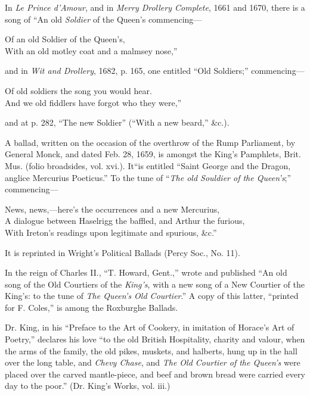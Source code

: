 In \textit{Le Prince d’Amour}, and in \textit{Merry Drollery Complete}, 1661 and 1670, there
is a song of “An old \textit{Soldier} of the Queen’s commencing—
\settowidth{\versewidth}{With an old motley coat and a malmsey nose,”}
\begin{scverse}
Of an old Soldier of the Queen’s,\\
With an old motley coat and a malmsey nose,”
\end{scverse}
and in \textit{Wit and Drollery}, 1682, p. 165, one entitled “Old Soldiers;” commencing—
\settowidth{\versewidth}{And we old fiddlers have forgot who they were,”}
\begin{scverse}
Of old soldiers the song you would hear.\\
And we old fiddlers have forgot who they were,”
\end{scverse}
and at p. 282, “The new Soldier” (“With a new beard,” \&c.).

A ballad, written on the occasion of the overthrow of the Rump Parliament,
by General Monck, and dated Feb. 28, 1659, is amongst the King’s Pamphlets,
Brit. Mus. (folio broadsides, vol. xvi.). It“is entitled “Saint George and the
Dragon, anglice Mercurius Poeticus.” To the tune of “\textit{The old Souldier of the
Queen’s};” commencing—
\settowidth{\versewidth}{A dialogue between Haselrigg the baffled, and Arthur the furious}
\begin{scverse}
News, news,—here’s the occurrences and a new Mercurius,\\
A dialogue between Haselrigg the baffled, and Arthur the furious,\\
With Ireton’s readings upon legitimate and spurious, \&c.”
\end{scverse}
It is reprinted in Wright’s Political Ballads (Percy Soc., No. 11).

In the reign of Charles II., “T. Howard, Gent.,” wrote and published “An
old song of the Old Courtiers of the \textit{King’s}, \pagebreak with a new song of a New Courtier of
the King’s: to the tune of \textit{The Queen’s Old Courtier}.” A copy of this latter,
“printed for F. Coles,” is among the Roxburghe Ballads.

Dr. King, in his “Preface to the Art of Cookery, in imitation of Horace’s Art
of Poetry,” declares his love “to the old British Hospitality, charity and valour,
when the arms of the family, the old pikes, muskets, and halberts, hung up in
the hall over the long table, and \textit{Chevy Chase}, and \textit{The Old Courtier of the Queen’s}
were placed over the carved mantle-piece, and beef and brown bread were carried
every day to the poor.” (Dr. King’s Works, vol. iii.)

